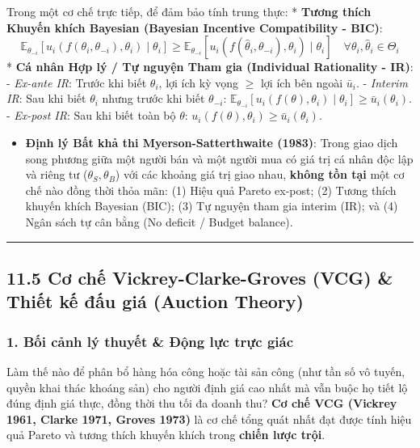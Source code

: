 \documentclass[
]{article}
\providecommand{\tightlist}{%
  \setlength{\itemsep}{0pt}\setlength{\parskip}{0pt}}
\begin{document}
Trong một cơ chế trực tiếp, để đảm bảo tính trung thực: * \textbf{Tương
thích Khuyến khích Bayesian (Bayesian Incentive Compatibility - BIC)}:
\[ \mathbb{E}_{\theta_{-i}}\left[ u_i(f(\theta_i, \theta_{-i}), \theta_i) \mid \theta_i \right] \ge \mathbb{E}_{\theta_{-i}}\left[ u_i(f(\hat{\theta}_i, \theta_{-i}), \theta_i) \mid \theta_i \right] \quad \forall \theta_i, \hat{\theta}_i \in \Theta_i \]
* \textbf{Cá nhân Hợp lý / Tự nguyện Tham gia (Individual Rationality -
IR)}: - \emph{Ex-ante IR}: Trước khi biết \(\theta_i\), lợi ích kỳ vọng
\(\ge\) lợi ích bên ngoài \(\bar{u}_i\). - \emph{Interim IR}: Sau khi
biết \(\theta_i\) nhưng trước khi biết \(\theta_{-i}\):
\(\mathbb{E}_{\theta_{-i}}[u_i(f(\theta), \theta_i) \mid \theta_i] \ge \bar{u}_i(\theta_i)\).
- \emph{Ex-post IR}: Sau khi biết toàn bộ \(\theta\):
\(u_i(f(\theta), \theta_i) \ge \bar{u}_i(\theta_i)\).

\begin{itemize}
\tightlist
\item
  \textbf{Định lý Bất khả thi Myerson-Satterthwaite (1983)}: Trong giao
  dịch song phương giữa một người bán và một người mua có giá trị cá
  nhân độc lập và riêng tư (\(\theta_S, \theta_B\)) với các khoảng giá
  trị giao nhau, \textbf{không tồn tại} một cơ chế nào đồng thời thỏa
  mãn: (1) Hiệu quả Pareto ex-post; (2) Tương thích khuyến khích
  Bayesian (BIC); (3) Tự nguyện tham gia interim (IR); và (4) Ngân sách
  tự cân bằng (No deficit / Budget balance).
\end{itemize}

\begin{center}\rule{0.5\linewidth}{0.5pt}\end{center}

\subsection{11.5 Cơ chế Vickrey-Clarke-Groves (VCG) \& Thiết kế đấu giá
(Auction
Theory)}\label{cux1a1-chux1ebf-vickrey-clarke-groves-vcg-thiux1ebft-kux1ebf-ux111ux1ea5u-giuxe1-auction-theory}

\subsubsection{1. Bối cảnh lý thuyết \& Động lực trực
giác}\label{bux1ed1i-cux1ea3nh-luxfd-thuyux1ebft-ux111ux1ed9ng-lux1ef1c-trux1ef1c-giuxe1c-4}

Làm thế nào để phân bổ hàng hóa công hoặc tài sản công (như tần số vô
tuyến, quyền khai thác khoáng sản) cho người định giá cao nhất mà vẫn
buộc họ tiết lộ đúng định giá thực, đồng thời thu tối đa doanh thu?
\textbf{Cơ chế VCG (Vickrey 1961, Clarke 1971, Groves 1973)} là cơ chế
tổng quát nhất đạt được tính hiệu quả Pareto và tương thích khuyến khích
trong \textbf{chiến lược trội}.
\end{document}
